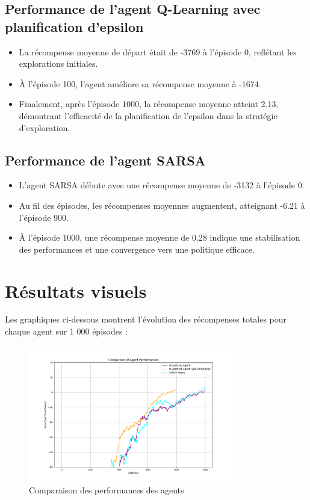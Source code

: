 \documentclass{article}
\begin{document}
\subsection{Performance de l'agent Q-Learning avec planification d'epsilon}
\begin{itemize}
    \item La récompense moyenne de départ était de -3769 à l'épisode 0, reflétant les explorations initiales.
    \item À l'épisode 100, l'agent améliore sa récompense moyenne à -1674.
    \item Finalement, après l'épisode 1000, la récompense moyenne atteint 2.13, démontrant l'efficacité de la planification de l'epsilon dans la stratégie d'exploration.
\end{itemize}

\subsection{Performance de l'agent SARSA}
\begin{itemize}
    \item L'agent SARSA débute avec une récompense moyenne de -3132 à l'épisode 0.
    \item Au fil des épisodes, les récompenses moyennes augmentent, atteignant -6.21 à l'épisode 900.
    \item À l'épisode 1000, une récompense moyenne de 0.28 indique une stabilisation des performances et une convergence vers une politique efficace.
\end{itemize}

\section{Résultats visuels}

Les graphiques ci-dessous montrent l'évolution des récompenses totales pour chaque agent sur 1 000 épisodes :

\begin{figure}[H]
    \centering
    \includegraphics[width=0.8\textwidth]{imgs/ComparisonAgentPerf.png}
    \caption{Comparaison des performances des agents}
\end{figure}
\end{document}

